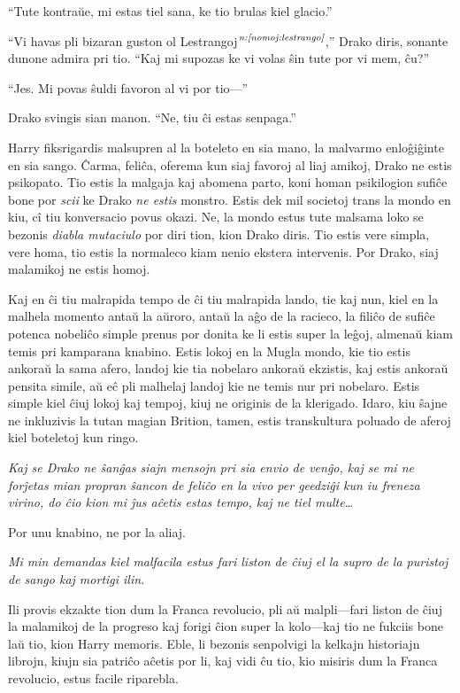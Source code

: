 ``Tute kontraŭe, mi estas tiel sana, ke tio brulas kiel glacio.''

``Vi havas pli bizaran guston ol Lestrangoj$^{\textit{n:\ref{nomoj:lestrango}}}$,''
Drako diris, sonante dunone admira pri tio. ``Kaj mi supozas ke vi
volas ŝin tute por vi mem, ĉu?''

``Jes. Mi povas ŝuldi favoron al vi por tio—''

Drako svingis sian manon. ``Ne, tiu ĉi estas senpaga.''

Harry fiksrigardis malsupren al la boteleto en sia mano, la malvarmo
enloĝiĝinte en sia sango. Ĉarma, feliĉa, oferema kun siaj favoroj al
liaj amikoj, Drako ne estis psikopato. Tio estis la malgaja kaj
abomena parto, koni homan psikilogion sufiĉe bone por \emph{scii} ke
Drako \emph{ne estis} monstro. Estis dek mil societoj trans la mondo
en kiu, cî tiu konversacio povus okazi. Ne, la mondo estus tute
malsama loko se bezonis \emph{diabla mutaciulo} por diri tion, kion
Drako diris. Tio estis vere simpla, vere homa, tio estis la normaleco
kiam nenio ekstera intervenis. Por Drako, siaj malamikoj ne estis homoj.

Kaj en ĉi tiu malrapida tempo de ĉi tiu malrapida lando, tie kaj nun,
kiel en la malhela momento antaŭ la aŭroro, antaŭ la aĝo de la
racieco, la filiĉo de sufiĉe potenca nobeliĉo simple prenus por donita
ke li estis super la leĝoj, almenaŭ kiam temis pri kamparana
knabino. Estis lokoj en la Mugla mondo, kie tio estis ankoraŭ la sama
afero, landoj kie tia nobelaro ankoraŭ ekzistis, kaj estis ankoraŭ
pensita simile, aŭ eĉ pli malhelaj landoj kie ne temis nur pri
nobelaro. Estis simple kiel ĉiuj lokoj kaj tempoj, kiuj ne originis de
la klerigado. Idaro, kiu ŝajne ne inkluzivis la tutan magian Brition,
tamen, estis transkultura poluado de aferoj kiel boteletoj kun ringo.

\emph{Kaj se Drako ne ŝanĝas siajn mensojn pri sia envio de venĝo, kaj
  se mi ne forĵetas mian propran ŝancon de feliĉo en la vivo per
  geedziĝi kun iu freneza virino, do ĉio kion mi ĵus aĉetis estas
  tempo, kaj ne tiel multe\ldots}

Por unu knabino, ne por la aliaj.

\emph{Mi min demandas kiel malfacila estus fari liston de ĉiuj el la
  supro de la puristoj de sango kaj mortigi ilin.}

Ili provis ekzakte tion dum la Franca revolucio, pli aŭ malpli—fari
liston de ĉiuj la malamikoj de la progreso kaj forigi ĉion super la
kolo—kaj tio ne fukciis bone laŭ tio, kion Harry memoris. Eble, li
bezonis senpolvigi la kelkajn historiajn librojn, kiujn sia patriĉo
aĉetis por li, kaj vidi ĉu tio, kio misiris dum la Franca revolucio,
estus facile riparebla.


